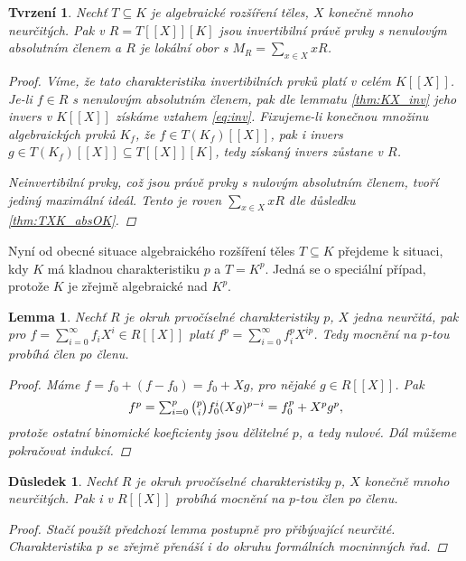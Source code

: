 \documentclass[11pt,a4paper]{article}
\newcommand*{\ml}[1]{\[\textstyle\let\displaystyle\textstyle#1\]}	%
\newcounter{numb}
\theoremstyle{definition}
\theoremstyle{plain}
\newtheorem{lemma}[numb]{Lemma}
\newtheorem{tvrzeni}[numb]{Tvrzení}
\newtheorem{dusledek}[numb]{Důsledek}
\begin{document}
\begin{tvrzeni}
	Nechť $T \subseteq K$ je algebraické rozšíření těles, $X$ konečně mnoho neurčitých. Pak v $R = T[[X]][K]$ jsou invertibilní právě prvky s nenulovým absolutním členem a $R$ je lokální obor s $M_R = \sum_{x \in X} xR$.

	\begin{proof}
		Víme, že tato charakteristika invertibilních prvků platí v celém $K[[X]]$. Je-li $f \in R$ s nenulovým absolutním členem, pak dle lemmatu \ref{thm:KX_inv} jeho invers v $K[[X]]$ získáme vztahem \eqref{eq:inv}. Fixujeme-li konečnou množinu algebraických prvků $K_f$, že $f \in T(K_f)[[X]]$, pak i invers $g \in T(K_f)[[X]] \subseteq T[[X]][K]$, tedy získaný invers zůstane v $R$.

		Neinvertibilní prvky, což jsou právě prvky s nulovým absolutním členem, tvoří jediný maximální ideál. Tento je roven $\sum_{x \in X} x R$ dle důsledku \ref{thm:TXK_absOK}.
	\end{proof}
\end{tvrzeni}

Nyní od obecné situace algebraického rozšíření těles $T \subseteq K$ přejdeme k situaci, kdy $K$ má kladnou charakteristiku $p$ a $T = K^p$. Jedná se o speciální případ, protože $K$ je zřejmě algebraické nad $K^p$.

\begin{lemma}
	Nechť $R$ je okruh prvočíselné charakteristiky $p$, $X$ jedna neurčitá, pak pro $f = \sum_{i = 0}^\infty f_i X^i \in R[[X]]$ platí $f^p = \sum_{i = 0}^\infty f_i^p X^{ip}$. Tedy mocnění na $p$-tou probíhá člen po členu.

	\begin{proof}
		Máme $f = f_0 + (f - f_0) = f_0 + X g$, pro nějaké $g \in R[[X]]$. Pak
		\ml{
			f^p = \sum_{i = 0}^p \binom{p}{i} f_0^i (X g)^{p - i} = f_0^p + X^p g^p,
		}
		protože ostatní binomické koeficienty jsou dělitelné $p$, a tedy nulové. Dál můžeme pokračovat indukcí.
	\end{proof}
\end{lemma}

\begin{dusledek} \label{thm:p_power}
	Nechť $R$ je okruh prvočíselné charakteristiky $p$, $X$ konečně mnoho neurčitých. Pak i v $R[[X]]$ probíhá mocnění na $p$-tou člen po členu.

	\begin{proof}
		Stačí použít předchozí lemma postupně pro přibývající neurčité. Charakteristika $p$ se zřejmě přenáší i do okruhu formálních mocninných řad.
	\end{proof}
\end{dusledek}
\end{document}
